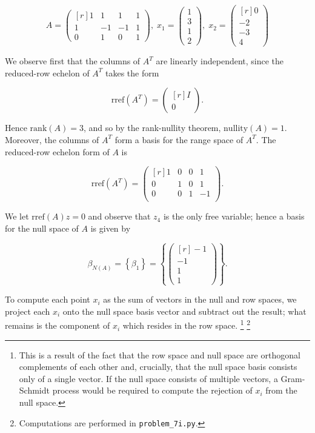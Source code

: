 $$
A = \begin{pmatrix*}[r]
  1 &  1 &  1 & 1 \\
  1 & -1 & -1 & 1 \\
  0 &  1 &  0 & 1
\end{pmatrix*},\; x_1 = \begin{pmatrix}
  1 \\
  3 \\
  1 \\
  2
\end{pmatrix},\; x_2 = \begin{pmatrix*}[r]
   0 \\
  -2 \\
  -3 \\
   4
\end{pmatrix*}
$$


\begin{solution}
  We observe first that the columns of $A^T$ are linearly independent, since the reduced-row echelon of $A^T$ takes the
  form

  $$
  \text{rref}(A^T) = \begin{pmatrix*}[r]
    I \\
    0
  \end{pmatrix*}.
  $$

  Hence $\text{rank}(A) = 3$, and so by the rank-nullity theorem, $\text{nullity}(A) = 1$. Moreover, the columns of 
  $A^T$ form a basis for the range space of $A^T$. The reduced-row echelon form of $A$ is


  $$
  \text{rref}(A^T) = \begin{pmatrix*}[r]
    1 & 0 & 0 & 1 \\
    0 & 1 & 0 & 1 \\
    0 & 0 & 1 & -1 \\
  \end{pmatrix*}.
  $$

  We let $\text{rref}(A)z = 0$ and observe that $z_4$ is the only free variable; hence a basis for the null space of
  $A$ is given by

  $$
  \beta_{N(A)} = \left\{ \beta_1 \right\} = \left\{\begin{pmatrix*}[r]
    -1 \\
    -1 \\
     1 \\
     1
  \end{pmatrix*}\right\}.
  $$

  To compute each point $x_i$ as the sum of vectors in the null and row spaces, we project each $x_i$ onto the 
  null space basis vector and subtract out the result; what remains is the component of $x_i$ which resides in the row 
  space. \footnote{
    This is a result of the fact that the row space and null space are orthogonal complements of each other and, 
    crucially, that the null space basis consists only of a single vector. If the null space consists of multiple 
    vectors, a Gram-Schmidt process would be required to compute the rejection of $x_i$ from the 
    null space.
  } \footnote{
    Computations are performed in \texttt{problem\_7i.py}.
  }


\end{solution}
